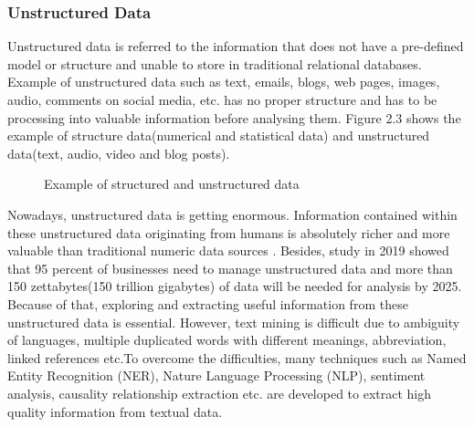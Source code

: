 \documentclass[twoside]{utmthesis}
\begin{document}
\subsubsection{Unstructured Data}
Unstructured data is referred to the information that does not have a pre-defined model or structure and unable to store in traditional relational databases. Example of unstructured data such as text, emails, blogs, web pages, images, audio, comments on social media, etc. has no proper structure and has to be processing into valuable information before analysing them. Figure 2.3 shows the example of structure data(numerical and statistical data) and unstructured data(text, audio, video and blog posts).
\begin{figure}[H]
	\centering
	\caption{Example of structured and unstructured data \citep{michaelbenzmoritzmuller}}
	\label{fig:unstructured-data-examples}
\end{figure}
\vspace{-1.5cm}

Nowadays, unstructured data is getting enormous. Information contained within these unstructured data originating from humans is absolutely richer and more valuable than traditional numeric data sources \citep{FRUNZA2016263}. Besides, study in 2019 \citep{rohitbigdata2019} showed that 95 percent of businesses need to manage unstructured data and more than 150 zettabytes(150 trillion gigabytes) of data will be needed for analysis by 2025. Because of that, exploring and extracting useful information from these unstructured data is essential. However, text mining is difficult due to ambiguity of languages, multiple duplicated words with different meanings, abbreviation, linked references etc\citep{bhardwaj2016text}.To overcome the difficulties, many techniques such as Named Entity Recognition (NER), Nature Language Processing (NLP), sentiment analysis, causality relationship extraction etc. are developed to extract high quality information from textual data. 
\end{document}
